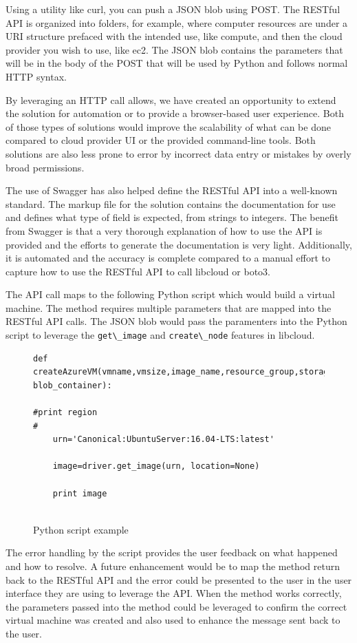 Using a utility like curl, you can push a JSON blob using POST. The RESTful API
is organized into folders, for example, where computer resources are under a
URI
structure prefaced with the intended use, like compute, and then the cloud
provider you wish to use, like ec2. The JSON blob contains the parameters that
will be in the body of the POST that will be used by Python and follows normal
HTTP syntax.

By leveraging an HTTP call allows, we have created an opportunity to extend the
solution for automation or to provide a browser-based user experience. Both of
those types of solutions would improve the scalability of what can be done
compared to cloud provider UI or the provided command-line tools. Both
solutions
are also less prone to error by incorrect data entry or mistakes by overly
broad
permissions. 

The use of Swagger has also helped define the RESTful API into a well-known
standard. The markup file for the solution contains the documentation for use
and defines what type of field is expected, from strings to integers. The
benefit from Swagger is that a very thorough explanation of how to use the API
is provided and the efforts to generate the documentation is very light.
Additionally, it is automated and the accuracy is complete compared to a manual
effort to capture how to use the RESTful API to call libcloud or boto3.

The API call maps to the following Python script which would build a virtual
machine. The method requires multiple parameters that are mapped into the
RESTful API calls. The JSON blob would pass the paramenters into the Python
script to leverage the \verb|get\_image| and \verb|create\_node| features in
libcloud.

\begin{figure}[htb]
\begin{verbatim}
def
createAzureVM(vmname,vmsize,image_name,resource_group,storage_account,nw_intf,
blob_container): 

#print region
#
	urn='Canonical:UbuntuServer:16.04-LTS:latest'

	image=driver.get_image(urn, location=None)

	print image
	
\end{verbatim}

\caption{Python script example}\label{c:Python-example}
\end{figure}	

The error handling by the script provides the user feedback on what happened
and how to resolve. A future enhancement would be to map the method return back
to the RESTful API and the error could be presented to the user in the user
interface they are using to leverage the API. When the method works correctly,
the parameters passed into the method could be leveraged to confirm the correct
virtual machine was created and also used to enhance the message sent back to
the user.

